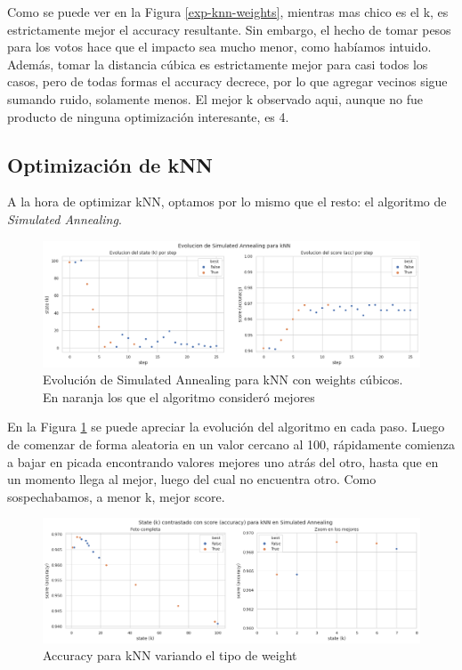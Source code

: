 \documentclass[a4paper]{article}
\begin{document}
    Como se puede ver en la Figura \ref{exp-knn-weights}, mientras mas chico es el k, es estrictamente mejor el accuracy resultante. Sin embargo, el hecho de tomar pesos para los votos hace que el impacto sea mucho menor, como habíamos intuido. Además, tomar la distancia cúbica es estrictamente mejor para casi todos los casos, pero de todas formas el accuracy decrece, por lo que agregar vecinos sigue sumando ruido, solamente menos. El mejor k observado aqui, aunque no fue producto de ninguna optimización interesante, es 4.
    
    \subsection{Optimización de kNN}
    A la hora de optimizar kNN, optamos por lo mismo que el resto: el algoritmo de \textit{Simulated Annealing}.
    
    \begin{figure}[H]
        \begin{center}
            \includegraphics[scale=0.425]{img/exp/knn/knn_sim_ann_evol.png}
            \caption{Evolución de Simulated Annealing para kNN con weights cúbicos. En naranja los que el algoritmo consideró mejores}
            \label{exp-knn-sim-ann-evol}
        \end{center}
    \end{figure}
    
    En la Figura \ref{exp-knn-sim-ann-evol} se puede apreciar la evolución del algoritmo en cada paso. Luego de comenzar de forma aleatoria en un valor cercano al 100, rápidamente comienza a bajar en picada encontrando valores mejores uno atrás del otro, hasta que en un momento llega al mejor, luego del cual no encuentra otro. Como sospechabamos, a menor k, mejor score.
    
    \begin{figure}[H]
        \begin{center}
            \includegraphics[scale=0.425]{img/exp/knn/knn_sim_ann.png}
            \caption{Accuracy para kNN variando el tipo de weight}
            \label{exp-knn-sim-ann}
        \end{center}
    \end{figure}
    
\end{document}
